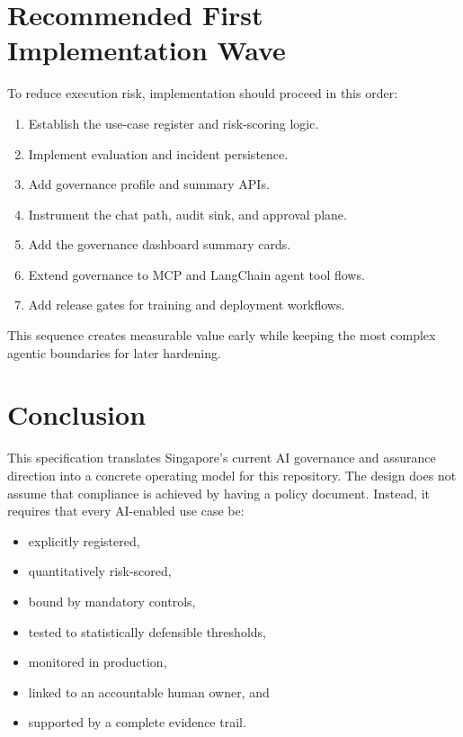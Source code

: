 \documentclass[11pt,a4paper]{article}
\begin{document}
\section{Recommended First Implementation Wave}

To reduce execution risk, implementation should proceed in this order:

\begin{enumerate}[nosep]
    \item Establish the use-case register and risk-scoring logic.
    \item Implement evaluation and incident persistence.
    \item Add governance profile and summary APIs.
    \item Instrument the chat path, audit sink, and approval plane.
    \item Add the governance dashboard summary cards.
    \item Extend governance to MCP and LangChain agent tool flows.
    \item Add release gates for training and deployment workflows.
\end{enumerate}

This sequence creates measurable value early while keeping the most complex agentic boundaries for later hardening.

\section{Conclusion}

This specification translates Singapore's current AI governance and assurance direction into a concrete operating model for this repository. The design does not assume that compliance is achieved by having a policy document. Instead, it requires that every AI-enabled use case be:

\begin{itemize}[nosep]
    \item explicitly registered,
    \item quantitatively risk-scored,
    \item bound by mandatory controls,
    \item tested to statistically defensible thresholds,
    \item monitored in production,
    \item linked to an accountable human owner, and
    \item supported by a complete evidence trail.
\end{itemize}
\end{document}
